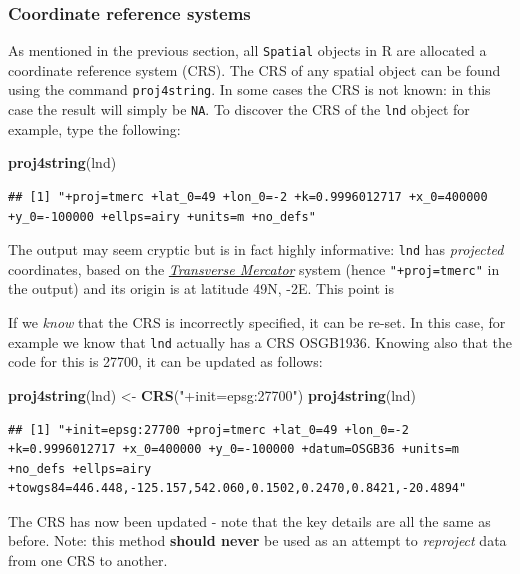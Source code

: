 \documentclass[]{article}
\newenvironment{Shaded}{}{}
\newcommand{\KeywordTok}[1]{\textcolor[rgb]{0.00,0.44,0.13}{\textbf{{#1}}}}
\newcommand{\StringTok}[1]{\textcolor[rgb]{0.25,0.44,0.63}{{#1}}}
\newcommand{\NormalTok}[1]{{#1}}
\begin{document}
\subsubsection{Coordinate reference systems}

As mentioned in the previous section, all \texttt{Spatial} objects in R
are allocated a coordinate reference system (CRS). The CRS of any
spatial object can be found using the command \texttt{proj4string}. In
some cases the CRS is not known: in this case the result will simply be
\texttt{NA}. To discover the CRS of the \texttt{lnd} object for example,
type the following:

\begin{Shaded}
\begin{Highlighting}[]
\KeywordTok{proj4string}\NormalTok{(lnd)}
\end{Highlighting}
\end{Shaded}
\begin{verbatim}
## [1] "+proj=tmerc +lat_0=49 +lon_0=-2 +k=0.9996012717 +x_0=400000 +y_0=-100000 +ellps=airy +units=m +no_defs"
\end{verbatim}
The output may seem cryptic but is in fact highly informative:
\texttt{lnd} has \emph{projected} coordinates, based on the
\href{http://en.wikipedia.org/wiki/Transverse\_Mercator\_projection}{\emph{Transverse
Mercator}} system (hence \texttt{"+proj=tmerc"} in the output) and its
origin is at latitude 49N, -2E. This point is

If we \emph{know} that the CRS is incorrectly specified, it can be
re-set. In this case, for example we know that \texttt{lnd} actually has
a CRS OSGB1936. Knowing also that the code for this is 27700, it can be
updated as follows:

\begin{Shaded}
\begin{Highlighting}[]
\KeywordTok{proj4string}\NormalTok{(lnd) <- }\KeywordTok{CRS}\NormalTok{(}\StringTok{"+init=epsg:27700"}\NormalTok{)}
\KeywordTok{proj4string}\NormalTok{(lnd)}
\end{Highlighting}
\end{Shaded}
\begin{verbatim}
## [1] "+init=epsg:27700 +proj=tmerc +lat_0=49 +lon_0=-2 +k=0.9996012717 +x_0=400000 +y_0=-100000 +datum=OSGB36 +units=m +no_defs +ellps=airy +towgs84=446.448,-125.157,542.060,0.1502,0.2470,0.8421,-20.4894"
\end{verbatim}
The CRS has now been updated - note that the key details are all the
same as before. Note: this method \textbf{should never} be used as an
attempt to \emph{reproject} data from one CRS to another.
\end{document}
